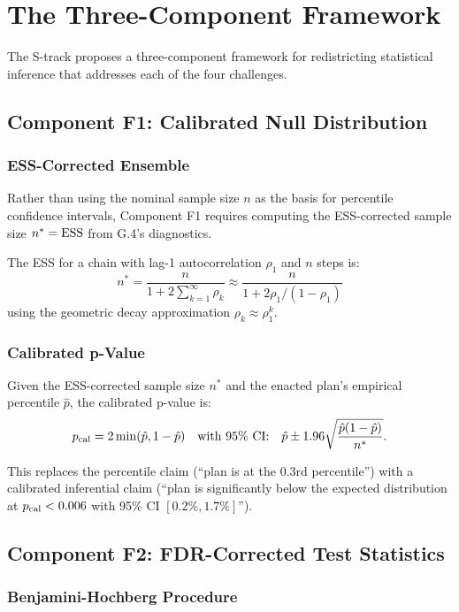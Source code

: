 \section{The Three-Component Framework}
\label{sec:framework}

The S-track proposes a three-component framework for redistricting
statistical inference that addresses each of the four challenges.

\subsection{Component F1: Calibrated Null Distribution}

\subsubsection{ESS-Corrected Ensemble}

Rather than using the nominal sample size $n$ as the basis for
percentile confidence intervals, Component F1 requires computing the
ESS-corrected sample size $n^* = \mathrm{ESS}$ from G.4's diagnostics.

The ESS for a chain with lag-1 autocorrelation $\rho_1$ and $n$ steps is:
\[
  n^* = \frac{n}{1 + 2\sum_{k=1}^\infty \rho_k} \approx
  \frac{n}{1 + 2\rho_1 / (1 - \rho_1)}
\]
using the geometric decay approximation $\rho_k \approx \rho_1^k$.

\subsubsection{Calibrated p-Value}

Given the ESS-corrected sample size $n^*$ and the enacted plan's
empirical percentile $\hat{p}$, the calibrated p-value is:
\[
  p_{\rm cal} = 2 \min(\hat{p}, 1 - \hat{p})
  \quad \text{with 95\% CI:} \quad
  \hat{p} \pm 1.96 \sqrt{\frac{\hat{p}(1-\hat{p})}{n^*}}.
\]

This replaces the percentile claim (``plan is at the 0.3rd percentile'')
with a calibrated inferential claim (``plan is significantly below the
expected distribution at $p_{\rm cal} < 0.006$ with 95\% CI $[0.2\%, 1.7\%]$'').

\subsection{Component F2: FDR-Corrected Test Statistics}

\subsubsection{Benjamini-Hochberg Procedure}

